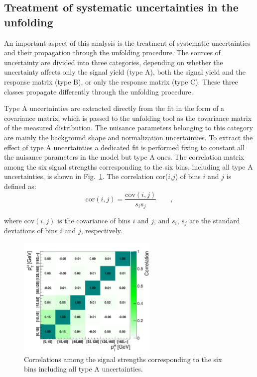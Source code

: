 \subsection{Treatment of systematic uncertainties in the unfolding}\label{sec:uncunf}

An important aspect of this analysis is the treatment of systematic
uncertainties and their propagation through the unfolding procedure.
The sources of uncertainty are divided into three categories, depending
on whether the uncertainty affects only the signal yield (type A), both the signal
yield and the response matrix (type B), or only the response matrix (type C).
These three classes propagate differently through the unfolding procedure.

Type A uncertainties are extracted directly from the fit in the form of a covariance
matrix, which is passed to the unfolding tool as the covariance
matrix of the measured distribution. The nuisance parameters belonging to this category
are mainly the background shape and normalization uncertainties.
To extract the effect of type A uncertainties a dedicated fit is performed fixing to constant all the nuisance parameters in the model but type A ones.
The correlation matrix among the six signal strengths corresponding to the six \pth bins, including all type A uncertainties, is shown in Fig.~\ref{fig:typeA_corr}.
The correlation cor($i$,$j$) of bins $i$ and $j$ is defined as:	
\begin{equation}\label{eq:correlation}
\mathrm{cor}(i,j) = \frac{ \mathrm{cov}(i,j) }{  s_{i}s_{j} } \qquad ,
\end{equation} 

\noindent where $\mathrm{cov}(i,j)$ is the covariance of bins $i$ and $j$, and $s_{i}$, $s_{j}$ are the standard deviations of bins $i$ and $j$,  respectively.

\begin{figure}[htb]
\centering
\includegraphics[width=0.6\textwidth]{images/typeACovMatrix.pdf}
\caption{Correlations among the signal strengths corresponding to the six \pth bins including all type A uncertainties.}\label{fig:typeA_corr}
\end{figure}

